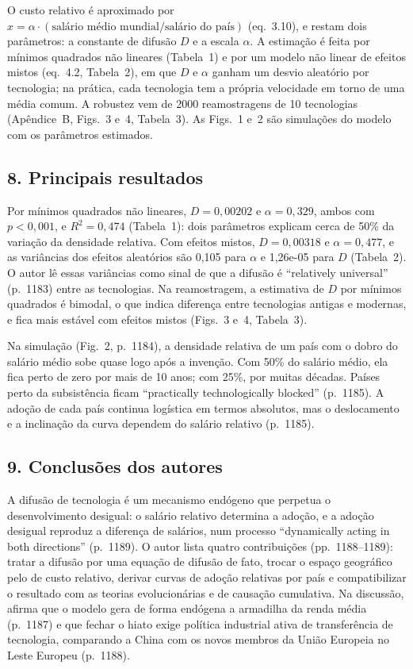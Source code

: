 O custo relativo é aproximado por $x = \alpha \cdot (\textrm{salário médio mundial}/\textrm{salário
do país})$ (eq.~3.10), e restam dois parâmetros: a constante de difusão $D$ e a escala $\alpha$. A
estimação é feita por mínimos quadrados não lineares (Tabela~1) e por um modelo não linear de
efeitos mistos (eq.~4.2, Tabela~2), em que $D$ e $\alpha$ ganham um desvio aleatório por tecnologia;
na prática, cada tecnologia tem a própria velocidade em torno de uma média comum. A robustez vem de
2000 reamostragens de 10 tecnologias (Apêndice~B, Figs.~3 e~4, Tabela~3). As Figs.~1 e~2 são
simulações do modelo com os parâmetros estimados.

\subsection*{8. Principais resultados}
Por mínimos quadrados não lineares, $D = 0{,}00202$ e $\alpha = 0{,}329$, ambos com $p < 0{,}001$,
e $R^2 = 0{,}474$ (Tabela~1): dois parâmetros explicam cerca de 50\% da variação da densidade
relativa. Com efeitos mistos, $D = 0{,}00318$ e $\alpha = 0{,}477$, e as variâncias dos efeitos
aleatórios são 0,105 para $\alpha$ e 1,26e-05 para $D$ (Tabela~2). O autor lê essas variâncias como
sinal de que a difusão é ``relatively universal'' (p.~1183) entre as tecnologias. Na reamostragem,
a estimativa de $D$ por mínimos quadrados é bimodal, o que indica diferença entre tecnologias
antigas e modernas, e fica mais estável com efeitos mistos (Figs.~3 e~4, Tabela~3).

Na simulação (Fig.~2, p.~1184), a densidade relativa de um país com o dobro do salário médio sobe
quase logo após a invenção. Com 50\% do salário médio, ela fica perto de zero por mais de 10 anos;
com 25\%, por muitas décadas. Países perto da subsistência ficam ``practically technologically
blocked'' (p.~1185). A adoção de cada país continua logística em termos absolutos, mas o
deslocamento e a inclinação da curva dependem do salário relativo (p.~1185).

\subsection*{9. Conclusões dos autores}
A difusão de tecnologia é um mecanismo endógeno que perpetua o desenvolvimento desigual: o salário
relativo determina a adoção, e a adoção desigual reproduz a diferença de salários, num processo
``dynamically acting in both directions'' (p.~1189). O autor lista quatro contribuições
(pp.~1188--1189): tratar a difusão por uma equação de difusão de fato, trocar o espaço geográfico
pelo de custo relativo, derivar curvas de adoção relativas por país e compatibilizar o resultado
com as teorias evolucionárias e de causação cumulativa. Na discussão, afirma que o modelo gera de
forma endógena a armadilha da renda média (p.~1187) e que fechar o hiato exige política industrial
ativa de transferência de tecnologia, comparando a China com os novos membros da União Europeia no
Leste Europeu (p.~1188).


